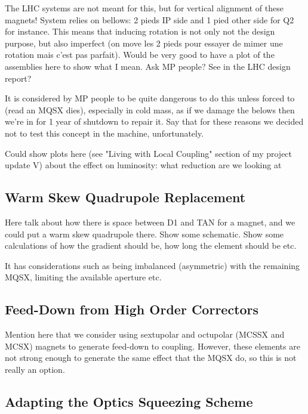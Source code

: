 
The LHC systems are not meant for this, but for vertical alignment of these magnets!
System relies on bellows: 2 pieds IP side and 1 pied other side for Q2 for instance.
This means that inducing rotation is not only not the design purpose, but also imperfect (on move les 2 pieds pour essayer de mimer une rotation mais c'est pas parfait).
Would be very good to have a plot of the assemblies here to show what I mean. Ask MP people? See in the LHC design report?

It is considered by MP people to be quite dangerous to do this unless forced to (read an MQSX dies), especially in cold mass, as if we damage the belows then we're in for 1 year of shutdown to repair it.
Say that for these reasons we decided not to test this concept in the machine, unfortunately.

Could show plots here (see "Living with Local Coupling" section of my project update V) about the effect on luminosity: what reduction are we looking at 

\subsection{Warm Skew Quadrupole Replacement}

Here talk about how there is space between D1 and TAN for a magnet, and we could put a warm skew quadrupole there.
Show some schematic.
Show some calculations of how the gradient should be, how long the element should be etc.

It has considerations such as being imbalanced (asymmetric) with the remaining MQSX, limiting the available aperture etc.

\subsection{Feed-Down from High Order Correctors}

Mention here that we consider using sextupolar and octupolar (MCSSX and MCSX) magnets to generate feed-down to coupling.
However, these elements are not strong enough to generate the same effect that the MQSX do, so this is not really an option.

\subsection{Adapting the Optics Squeezing Scheme}

